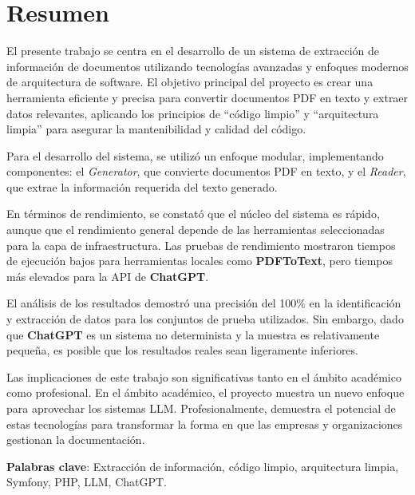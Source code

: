 \newpage
\section*{Resumen}
El presente trabajo se centra en el desarrollo de un sistema de extracción de información de documentos utilizando
tecnologías avanzadas y enfoques modernos de arquitectura de software.
El objetivo principal del proyecto es crear una herramienta eficiente y precisa para convertir documentos PDF en texto y
extraer datos relevantes, aplicando los principios de ``código limpio'' y ``arquitectura limpia'' para asegurar la
mantenibilidad y calidad del código.

Para el desarrollo del sistema, se utilizó un enfoque modular, implementando componentes: el \textit{Generator}, que
convierte documentos PDF en texto, y el \textit{Reader}, que extrae la información requerida del texto generado.

En términos de rendimiento, se constató que el núcleo del sistema es rápido, aunque que el rendimiento general depende
de las herramientas seleccionadas para la capa de infraestructura.
Las pruebas de rendimiento mostraron tiempos de ejecución bajos para herramientas locales como \textbf{PDFToText}, pero
tiempos más elevados para la API de \textbf{ChatGPT}.

El análisis de los resultados demostró una precisión del 100\% en la identificación y extracción de datos para los
conjuntos de prueba utilizados.
Sin embargo, dado que \textbf{ChatGPT} es un sistema no determinista y la muestra es relativamente pequeña, es posible
que los resultados reales sean ligeramente inferiores.

Las implicaciones de este trabajo son significativas tanto en el ámbito académico como profesional.
En el ámbito académico, el proyecto muestra un nuevo enfoque para aprovechar los sistemas LLM.
Profesionalmente, demuestra el potencial de estas tecnologías para transformar la forma en que las empresas y
organizaciones gestionan la documentación.

\vspace{1cm}

\textbf{Palabras clave}: Extracción de información, código limpio, arquitectura limpia, Symfony, PHP, LLM, ChatGPT.